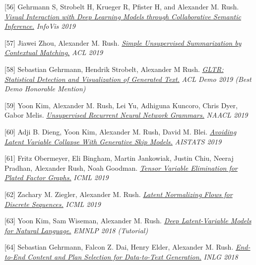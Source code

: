 \documentclass[10pt]{article}
\begin{document}
\medskip


[56] \ind Gehrmann S, Strobelt H, Krueger R, Pfister H, and Alexander M. Rush. \emph{\href{ https://arxiv.org/abs/1907.10739 }{ Visual Interaction with Deep Learning Models through Collaborative Semantic Inference.} }\emph{ InfoVis 2019 }

\medskip


[57] \ind Jiawei Zhou, Alexander M. Rush. \emph{\href{ https://www.aclweb.org/anthology/P19-1503 }{ Simple Unsupervised Summarization by Contextual Matching.} }\emph{ ACL 2019 }

\medskip


[58] \ind Sebastian Gehrmann, Hendrik Strobelt, Alexander M Rush. \emph{\href{ https://arxiv.org/abs/1906.04043 }{ GLTR: Statistical Detection and Visualization of Generated Text.} }\emph{ ACL Demo 2019 (Best Demo Honorable Mention) }

\medskip


[59] \ind Yoon Kim, Alexander M. Rush, Lei Yu, Adhiguna Kuncoro, Chris Dyer, Gabor Melis. \emph{\href{ https://arxiv.org/pdf/1904.03746.pdf }{ Unsupervised Recurrent Neural Network Grammars.} }\emph{ NAACL 2019 }

\medskip


[60] \ind Adji B. Dieng, Yoon Kim, Alexander M. Rush, David M. Blei. \emph{\href{ https://arxiv.org/pdf/1807.04863.pdf }{ Avoiding Latent Variable Collapse With Generative Skip Models.} }\emph{ AISTATS 2019 }

\medskip


[61] \ind Fritz Obermeyer, Eli Bingham, Martin Jankowiak, Justin Chiu, Neeraj Pradhan, Alexander Rush, Noah Goodman. \emph{\href{ https://arxiv.org/pdf/1902.03210.pdf }{ Tensor Variable Elimination for Plated Factor Graphs.} }\emph{ ICML 2019 }

\medskip


[62] \ind Zachary M. Ziegler, Alexander M. Rush. \emph{\href{ https://arxiv.org/pdf/1901.10548 }{ Latent Normalizing Flows for Discrete Sequences.} }\emph{ ICML 2019 }

\medskip


[63] \ind Yoon Kim, Sam Wiseman, Alexander M. Rush. \emph{\href{ https://github.com/harvardnlp/DeepLatentNLP/raw/master/tutorial_deep_latent.pdf }{ Deep Latent-Variable Models for Natural Language.} }\emph{ EMNLP 2018 (Tutorial) }

\medskip


[64] \ind Sebastian Gehrmann, Falcon Z. Dai, Henry Elder, Alexander M. Rush. \emph{\href{ https://arxiv.org/pdf/1810.04700 }{ End-to-End Content and Plan Selection for Data-to-Text Generation.} }\emph{ INLG 2018 }
\end{document}
